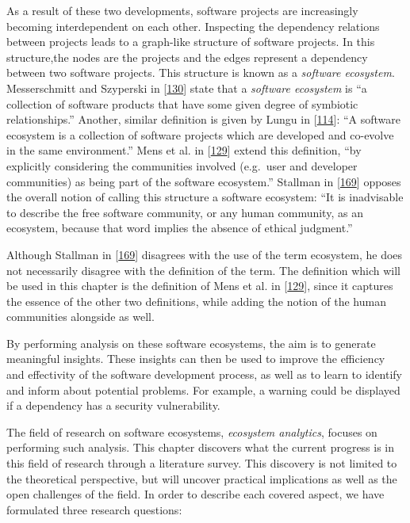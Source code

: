 \documentclass[]{book}
\begin{document}
As a result of these two developments, software projects are
increasingly becoming interdependent on each other. Inspecting the
dependency relations between projects leads to a graph-like structure of
software projects. In this structure,the nodes are the projects and the
edges represent a dependency between two software projects. This
structure is known as a \emph{software ecosystem}. Messerschmitt and
Szyperski in {[}\protect\hyperlink{ref-Messerschmitt2003}{130}{]} state
that a \emph{software ecosystem} is ``a collection of software products
that have some given degree of symbiotic relationships.'' Another,
similar definition is given by Lungu in
{[}\protect\hyperlink{ref-Lungu2009}{114}{]}: ``A software ecosystem is
a collection of software projects which are developed and co-evolve in
the same environment.'' Mens et al. in
{[}\protect\hyperlink{ref-Mens2013}{129}{]} extend this definition, ``by
explicitly considering the communities involved (e.g.~user and developer
communities) as being part of the software ecosystem.'' Stallman in
{[}\protect\hyperlink{ref-Stallman2002}{169}{]} opposes the overall
notion of calling this structure a software ecosystem: ``It is
inadvisable to describe the free software community, or any human
community, as an ecosystem, because that word implies the absence of
ethical judgment.''

Although Stallman in {[}\protect\hyperlink{ref-Stallman2002}{169}{]}
disagrees with the use of the term ecosystem, he does not necessarily
disagree with the definition of the term. The definition which will be
used in this chapter is the definition of Mens et al. in
{[}\protect\hyperlink{ref-Mens2013}{129}{]}, since it captures the
essence of the other two definitions, while adding the notion of the
human communities alongside as well.

By performing analysis on these software ecosystems, the aim is to
generate meaningful insights. These insights can then be used to improve
the efficiency and effectivity of the software development process, as
well as to learn to identify and inform about potential problems. For
example, a warning could be displayed if a dependency has a security
vulnerability.

The field of research on software ecosystems, \emph{ecosystem
analytics}, focuses on performing such analysis. This chapter discovers
what the current progress is in this field of research through a
literature survey. This discovery is not limited to the theoretical
perspective, but will uncover practical implications as well as the open
challenges of the field. In order to describe each covered aspect, we
have formulated three research questions:
\end{document}
